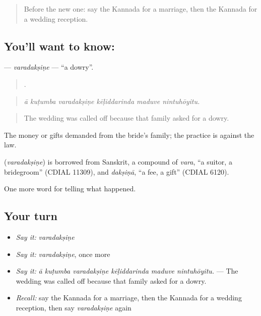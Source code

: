 \label{lesson:KA-C325-varadaksine}



\begin{quote}
Before the new one: say the Kannada for a marriage, then the Kannada for a wedding reception.
\end{quote}

\subsection*{You'll want to know: }
\textbf{} — \emph{varadakṣiṇe} — \textquotedblleft{}a dowry\textquotedblright{}.

\begin{quote}
     .
\end{quote}

\begin{quote}
\emph{ā kuṭumba varadakṣiṇe kēḷiddarinda maduve nintuhōyitu.}
\end{quote}

\begin{quote}
The wedding was called off because that family asked for a dowry.
\end{quote}

The money or gifts demanded from the bride's family; the practice is against the law.

\begin{cousinweb}
\textbf{} (\emph{varadakṣiṇe}) is borrowed from Sanskrit, a compound of \emph{vara}, \textquotedblleft{}a suitor, a bridegroom\textquotedblright{} (CDIAL 11309), and \emph{dakṣiṇā}, \textquotedblleft{}a fee, a gift\textquotedblright{} (CDIAL 6120).
\end{cousinweb}

\begin{grammarlens}[title={What you've built}]
One more word for telling what happened.
\end{grammarlens}

\subsection*{Your turn}
\begin{itemize}
\raggedright
  \item \emph{Say it:} \emph{varadakṣiṇe}
  \item \emph{Say it:} \emph{varadakṣiṇe}, once more
  \item \emph{Say it:} \emph{ā kuṭumba varadakṣiṇe kēḷiddarinda maduve nintuhōyitu.} — The wedding was called off because that family asked for a dowry.
  \item \emph{Recall:} say the Kannada for a marriage, then the Kannada for a wedding reception, then say \emph{varadakṣiṇe} again
\end{itemize}

